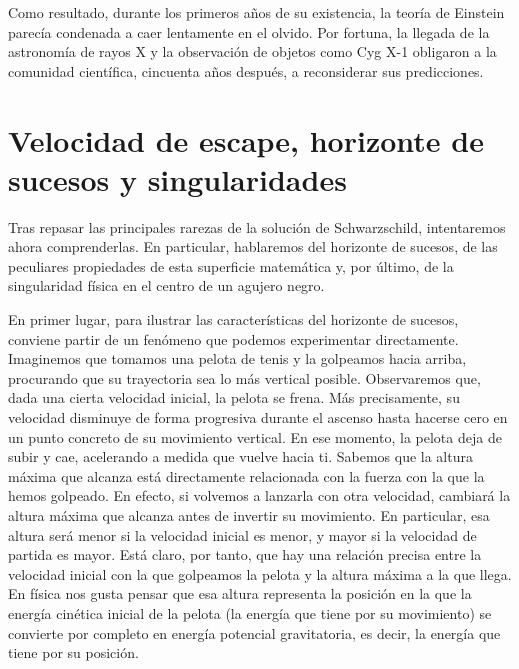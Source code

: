 Como resultado, durante los primeros años de su existencia, la teoría de Einstein parecía condenada a caer lentamente en el olvido. Por fortuna, la llegada de la astronomía de rayos X y la observación de objetos como Cyg X-1 obligaron a la comunidad científica, cincuenta años después, a reconsiderar sus predicciones.

\section[Velocidad de escape y horizonte de sucesos]{Velocidad de escape, horizonte de sucesos y singularidades}\label{sec:06-escape}

Tras repasar las principales rarezas de la solución de Schwarzschild, intentaremos ahora comprenderlas. En particular, hablaremos del horizonte de sucesos, de las peculiares propiedades de esta superficie matemática y, por último, de la singularidad física en el centro de un agujero negro.

En primer lugar, para ilustrar las características del horizonte de sucesos, conviene partir de un fenómeno que podemos experimentar directamente. Imaginemos que tomamos una pelota de tenis y la golpeamos hacia arriba, procurando que su trayectoria sea lo más vertical posible. Observaremos que, dada una cierta velocidad inicial, la pelota se frena. Más precisamente, su velocidad disminuye de forma progresiva durante el ascenso hasta hacerse cero en un punto concreto de su movimiento vertical. En ese momento, la pelota deja de subir y cae, acelerando a medida que vuelve hacia ti. Sabemos que la altura máxima que alcanza está directamente relacionada con la fuerza con la que la hemos golpeado. En efecto, si volvemos a lanzarla con otra velocidad, cambiará la altura máxima que alcanza antes de invertir su movimiento. En particular, esa altura será menor si la velocidad inicial es menor, y mayor si la velocidad de partida es mayor. Está claro, por tanto, que hay una relación precisa entre la velocidad inicial con la que golpeamos la pelota y la altura máxima a la que llega. En física nos gusta pensar que esa altura representa la posición en la que la energía cinética inicial de la pelota (la energía que tiene por su movimiento) se convierte por completo en energía potencial gravitatoria, es decir, la energía que tiene por su posición.


